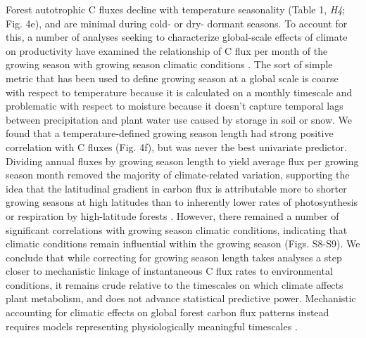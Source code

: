 \documentclass[
]{article}
\begin{document}
Forest autotrophic C fluxes decline with temperature seasonality (Table
1, \emph{H4}; Fig. 4e), and are minimal during cold- or dry- dormant
seasons. To account for this, a number of analyses seeking to
characterize global-scale effects of climate on productivity have
examined the relationship of C flux per month of the growing season with
growing season climatic conditions \citep[Table 1,
\emph{H5};][]{kerkhoff_plant_2005, anderson_temperature-dependence_2006, enquist_adaptive_2007, michaletz_convergence_2014}.
The sort of simple metric that has been used to define growing season at
a global scale \citep{kerkhoff_plant_2005} is coarse with respect to
temperature because it is calculated on a monthly timescale and
problematic with respect to moisture because it doesn't capture temporal
lags between precipitation and plant water use caused by storage in soil
or snow. We found that a temperature-defined growing season length had
strong positive correlation with C fluxes (Fig. 4f), but was never the
best univariate predictor. Dividing annual fluxes by growing season
length to yield average flux per growing season month removed the
majority of climate-related variation, supporting the idea that the
latitudinal gradient in carbon flux is attributable more to shorter
growing seasons at high latitudes than to inherently lower rates of
photosynthesis or respiration by high-latitude forests
\citep{enquist_adaptive_2007}. However, there remained a number of
significant correlations with growing season climatic conditions,
indicating that climatic conditions remain influential within the
growing season (Figs. S8-S9). We conclude that while correcting for
growing season length takes analyses a step closer to mechanistic
linkage of instantaneous C flux rates to environmental conditions, it
remains crude relative to the timescales on which climate affects plant
metabolism, and does not advance statistical predictive power.
Mechanistic accounting for climatic effects on global forest carbon flux
patterns instead requires models representing physiologically meaningful
timescales
\citep[e.g.,][]{medvigy_mechanistic_2009, longo_biophysics_2019}.
\end{document}
